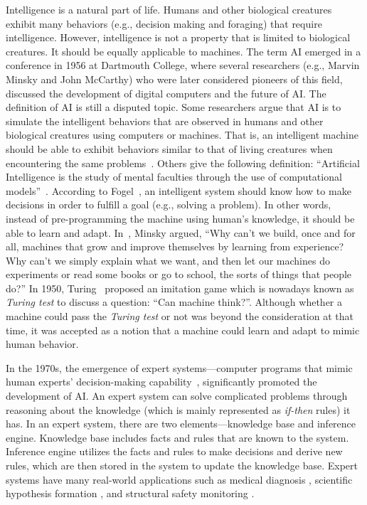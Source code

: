 Intelligence is a natural part of life. Humans and other biological creatures exhibit many behaviors (e.g., decision making and foraging) that require intelligence. However, intelligence is not a property that is limited to biological creatures. It should be equally applicable to machines. The term AI emerged in a conference in 1956 at Dartmouth College, where several researchers (e.g., Marvin Minsky and John McCarthy) who were later considered pioneers of this field, discussed the development of digital computers and the future of AI. The definition of AI is still a disputed topic.  Some researchers argue that AI is to simulate the intelligent behaviors that are observed in humans and other biological creatures using computers or machines. That is, an intelligent machine should be able to exhibit behaviors similar to that of living creatures when encountering the same problems~\cite{Schildt1985}. Others give the following definition: ``Artificial Intelligence is the study of mental faculties through the use of computational models''~\cite{Charniak1985}. According to Fogel~\cite{Fogel1995}, an intelligent system should know how to make decisions in order to fulfill a goal (e.g., solving a problem). In other words, instead of pre-programming the machine using human's knowledge, it should be able to learn and adapt. In~\cite{Minsky_1991}, Minsky argued, ``Why can't we build, once and for all, machines that grow and improve themselves by learning from experience? Why can't we simply explain what we want, and then let our machines do experiments or read some books or go to school, the sorts of things that people do?'' In 1950, Turing~\cite{Turing_1950} proposed an imitation game which is nowadays known as \textit{Turing test} to discuss a question: ``Can machine think?''. Although whether a machine could pass the \textit{Turing test} or not was beyond the consideration at that time, it was accepted as a notion that a machine could learn and adapt to mimic human behavior. %

In the 1970s, the emergence of expert systems---computer programs that mimic human experts' decision-making capability~\cite{Jackson1998}, significantly promoted the development of AI. An expert system can solve complicated problems through reasoning about the knowledge (which is mainly represented as \textit{if-then} rules) it has. In an expert system, there are two elements---knowledge base and inference engine. Knowledge base includes facts and rules that are known to the system. Inference engine utilizes the facts and rules to make decisions and derive new rules, which are then stored in the system to update the knowledge base. Expert systems have many real-world applications such as medical diagnosis \cite{Jonathan1990}, scientific hypothesis formation \cite{Robert1993}, and structural safety monitoring \cite{Salvaneschi1996}. 

